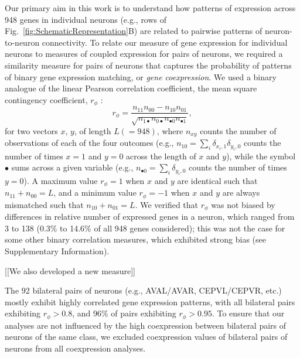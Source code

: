 \documentclass[10pt,letterpaper]{article}
\begin{document}
Our primary aim in this work is to understand how patterns of expression across 948 genes in individual neurons (e.g., rows of Fig.~\ref{fig:SchematicRepresentation}B) are related to pairwise patterns of neuron-to-neuron connectivity.
To relate our measure of gene expression for individual neurons to measures of coupled expression for pairs of neurons, we required a similarity measure for pairs of neurons that captures the probability of patterns of binary gene expression matching, or \emph{gene coexpression}.
We used a binary analogue of the linear Pearson correlation coefficient, the mean square contingency coefficient, $r_\phi$ \cite{Warrens2008}:
\begin{equation} \label{eq:rphi}
    r_\phi = \frac{n_{11}n_{00} - n_{10}n_{01}}{\sqrt{n_{1\bullet}n_{0\bullet}n_{\bullet 0}n_{\bullet 1}}},
\end{equation}
for two vectors $x$, $y$, of length $L (=948)$, where $n_{xy}$ counts the number of observations of each of the four outcomes (e.g., $n_{10} = \sum_i \delta_{x_i,1}\delta_{y_i,0}$ counts the number of times $x=1$ and $y=0$ across the length of $x$ and $y$), while the symbol $\bullet$ sums across a given variable (e.g., $n_{\bullet 0} = \sum_i \delta_{y_i,0}$ counts the number of times $y = 0$).
A maximum value $r_\phi = 1$ when $x$ and $y$ are identical such that $n_{11} + n_{00} = L$, and a minimum value $r_\phi = -1$ when $x$ and $y$ are always mismatched such that $n_{10} + n_{01} = L$.
We verified that $r_\phi$ was not biased by differences in relative number of expressed genes in a neuron, which ranged from 3 to 138 (0.3\% to 14.6\% of all 948 genes considered); this was not the case for some other binary correlation measures, which exhibited strong bias (see Supplementary Information).

[[We also developed a new measure]]


The 92 bilateral pairs of neurons (e.g., AVAL/AVAR, CEPVL/CEPVR, etc.) mostly exhibit highly correlated gene expression patterns, with all bilateral pairs exhibiting $r_\phi > 0.8$, and 96\% of pairs exhibiting $r_\phi > 0.95$.
To ensure that our analyses are not influenced by the high coexpression between bilateral pairs of neurons of the same class, we excluded coexpression values of bilateral pairs of neurons from all coexpression analyses.
\end{document}
